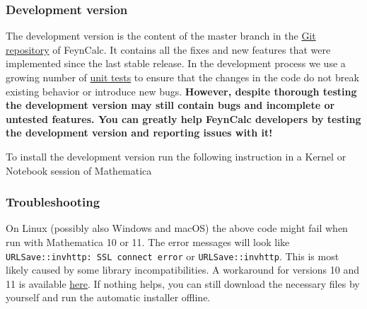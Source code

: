 \documentclass[../FeynCalcManual.tex]{subfiles}
\begin{document}
\hypertarget{development-version}{%
\subsubsection{Development version}\label{development-version}}

The development version is the content of the master branch in the
\href{https://github.com/FeynCalc/feyncalc}{Git repository} of FeynCalc.
It contains all the fixes and new features that were implemented since
the last stable release. In the development process we use a growing
number of
\href{https://github.com/FeynCalc/feyncalc/tree/master/Tests}{unit
tests} to ensure that the changes in the code do not break existing
behavior or introduce new bugs. \textbf{However, despite thorough
testing the development version may still contain bugs and incomplete or
untested features. You can greatly help FeynCalc developers by testing
the development version and reporting issues with it!}

To install the development version run the following instruction in a
Kernel or Notebook session of Mathematica

\begin{Shaded}
\begin{Highlighting}[]
\OperatorTok{[}\OperatorTok{]}
\OperatorTok{[}\OtherTok{{-}\textgreater{}} \OperatorTok{]}
\end{Highlighting}
\end{Shaded}

\hypertarget{troubleshooting}{%
\subsubsection{Troubleshooting}\label{troubleshooting}}

On Linux (possibly also Windows and macOS) the above code might fail
when run with Mathematica 10 or 11. The error messages will look like
\texttt{URLSave::invhttp: SSL connect error} or
\texttt{URLSave::invhttp}. This is most likely caused by some library
incompatibilities. A workaround for versions 10 and 11 is available
\href{https://mathematica.stackexchange.com/questions/212453/urlsave-in-mathematica-10-and-11-on-linux}{here}.
If nothing helps, you can still download the necessary files by yourself
and run the automatic installer offline.
\end{document}
